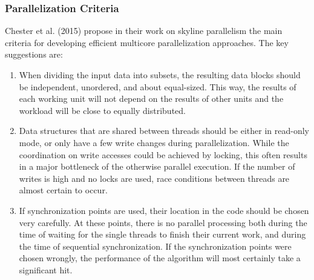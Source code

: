 \subsubsection{Parallelization Criteria} \label{subsection:parallelization-criteria}
Chester et al. \cite{chester} (2015) propose in their work on skyline parallelism the main criteria for developing efficient multicore parallelization approaches. The key suggestions are: 
\begin{enumerate}
	\item When dividing the input data into subsets, the resulting data blocks should be independent, unordered, and about equal-sized. This way, the results of each working unit will not depend on the results of other units and the workload will be close to equally distributed. 
	\item Data structures that are shared between threads should be either in read-only mode, or only have a few write changes during parallelization. While the coordination on write accesses could be achieved by locking, this often results in a major bottleneck of the otherwise parallel execution. If the number of writes is high and no locks are used, race conditions between threads are almost certain to occur. 
	\item If synchronization points are used, their location in the code should be chosen very carefully. At these points, there is no parallel processing both during the time of waiting for the single threads to finish their current work, and during the time of sequential synchronization. If the synchronization points were chosen wrongly, the performance of the algorithm will most certainly take a significant hit. 
\end{enumerate}

